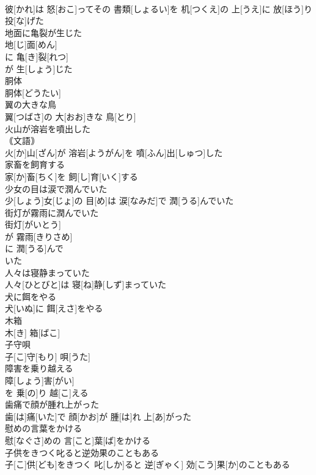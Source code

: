 \documentclass[8pt]{extreport}
\begin{document}
\begin{CJK}{UTF8}{min}
\\	彼[かれ]は 怒[おこ]ってその 書類[しょるい]を 机[つくえ]の 上[うえ]に 放[ほう]り 投[な]げた
\\	地面に亀裂が生じた	
\\	地[じ]面[めん]
\\	に 亀[き]裂[れつ]
\\	が 生[しょう]じた 
\\	胴体	
\\	胴体[どうたい]
\\	翼の大きな鳥	
\\	翼[つばさ]の 大[おお]きな 鳥[とり]
\\	火山が溶岩を噴出した	
\\	｟文語｠ 
\\	火[か]山[ざん]が 溶岩[ようがん]を 噴[ふん]出[しゅつ]した
\\	家畜を飼育する	
\\	家[か]畜[ちく]を 飼[し]育[いく]する
\\	少女の目は涙で潤んでいた	
\\	少[しょう]女[じょ]の 目[め]は 涙[なみだ]で 潤[うる]んでいた
\\	街灯が霧雨に潤んでいた	
\\	街灯[がいとう]
\\	が 霧雨[きりさめ]
\\	に 潤[うる]んで 
\\	いた
\\	人々は寝静まっていた	
\\	人々[ひとびと]は 寝[ね]静[しず]まっていた
\\	犬に餌をやる	
\\	犬[いぬ]に 餌[えさ]をやる
\\	木箱	
\\	木[き] 箱[ばこ]
\\	子守唄	
\\	子[こ]守[もり] 唄[うた]
\\	障害を乗り越える	
\\	障[しょう]害[がい]
\\	を 乗[の]り 越[こ]える 
\\	歯痛で顔が腫れ上がった	
\\	歯[は]痛[いた]で 顔[かお]が 腫[は]れ 上[あ]がった
\\	慰めの言葉をかける	
\\	慰[なぐさ]めの 言[こと]葉[ば]をかける
\\	子供をきつく叱ると逆効果のこともある	
\\	子[こ]供[ども]をきつく 叱[しか]ると 逆[ぎゃく] 効[こう]果[か]のこともある

\end{CJK}
\end{document}
